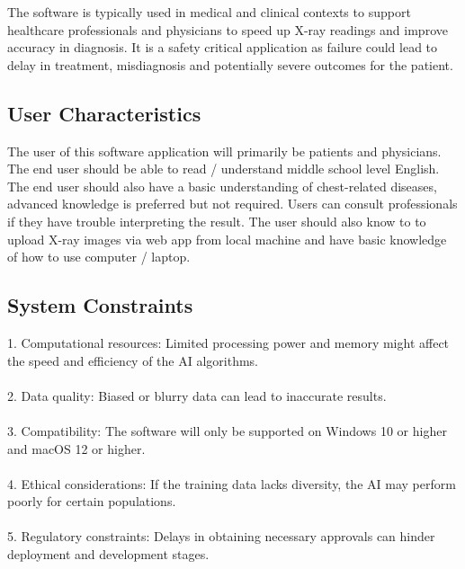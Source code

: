 \documentclass[12pt]{article}
\begin{document}
The software is typically used in medical and clinical contexts to support healthcare professionals and physicians to speed up X-ray readings and improve accuracy in diagnosis. It is a safety critical application as failure could lead to delay in treatment, misdiagnosis and potentially severe outcomes for the patient.


\subsection{User Characteristics} \label{SecUserCharacteristics}

The user of this software application will primarily be patients and physicians. The end user should be able to read / understand middle school level English. The end user should also have a basic understanding of chest-related diseases, advanced knowledge is preferred but not required. Users can consult professionals if they have trouble interpreting the result. The user should also know to to upload X-ray images via web app from local machine and have basic knowledge of how to use computer / laptop. \\

\subsection{System Constraints}

1. Computational resources: Limited processing power and memory might affect the speed and efficiency of the AI algorithms.\\
\\
2. Data quality: Biased or blurry data can lead to inaccurate results.\\
\\
3. Compatibility: The software will only be supported on Windows 10 or higher and macOS 12 or higher. \\
\\
4. Ethical considerations: If the training data lacks diversity, the AI may perform poorly for certain populations. \\
\\
5. Regulatory constraints: Delays in obtaining necessary approvals can hinder deployment and development stages.\\
\end{document}
